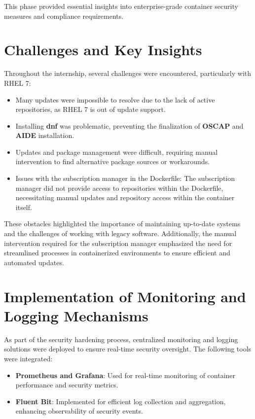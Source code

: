 \documentclass[12pt,a4paper]{report}
\begin{document}
This phase provided essential insights into enterprise-grade container security measures and compliance requirements.
\section{Challenges and Key Insights}
Throughout the internship, several challenges were encountered, particularly with RHEL 7:
\begin{itemize}
    \item Many updates were impossible to resolve due to the lack of active repositories, as RHEL 7 is out of update support.
    \item Installing \textbf{dnf} was problematic, preventing the finalization of \textbf{OSCAP} and \textbf{AIDE} installation.
    \item Updates and package management were difficult, requiring manual intervention to find alternative package sources or workarounds.
    \item Issues with the subscription manager in the Dockerfile: The subscription manager did not provide access to repositories within the Dockerfile, necessitating manual updates and repository access within the container itself.
\end{itemize}

These obstacles highlighted the importance of maintaining up-to-date systems and the challenges of working with legacy software. Additionally, the manual intervention required for the subscription manager emphasized the need for streamlined processes in containerized environments to ensure efficient and automated updates.


\section{Implementation of Monitoring and Logging Mechanisms}
As part of the security hardening process, centralized monitoring and logging solutions were deployed to ensure real-time security oversight. The following tools were integrated:

\begin{itemize}
    \item \textbf{Prometheus and Grafana}: Used for real-time monitoring of container performance and security metrics.
    \item \textbf{Fluent Bit}: Implemented for efficient log collection and aggregation, enhancing observability of security events.
\end{itemize}
\end{document}
